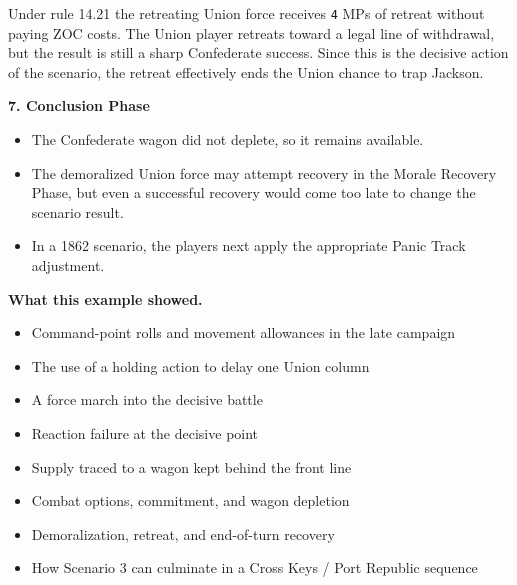 \documentclass[11pt]{article}
\begin{document}
Under rule 14.21 the retreating Union force receives \texttt{4} MPs of retreat without paying ZOC costs. The Union player retreats toward a legal line of withdrawal, but the result is still a sharp Confederate success. Since this is the decisive action of the scenario, the retreat effectively ends the Union chance to trap Jackson.

\textbf{7. Conclusion Phase}

\begin{itemize}
\item The Confederate wagon did not deplete, so it remains available.
\item The demoralized Union force may attempt recovery in the Morale Recovery Phase, but even a successful recovery would come too late to change the scenario result.
\item In a 1862 scenario, the players next apply the appropriate Panic Track adjustment.
\end{itemize}

\textbf{What this example showed.}

\begin{itemize}
\item Command-point rolls and movement allowances in the late campaign
\item The use of a holding action to delay one Union column
\item A force march into the decisive battle
\item Reaction failure at the decisive point
\item Supply traced to a wagon kept behind the front line
\item Combat options, commitment, and wagon depletion
\item Demoralization, retreat, and end-of-turn recovery
\item How Scenario 3 can culminate in a Cross Keys / Port Republic sequence
\end{itemize}
\end{document}
